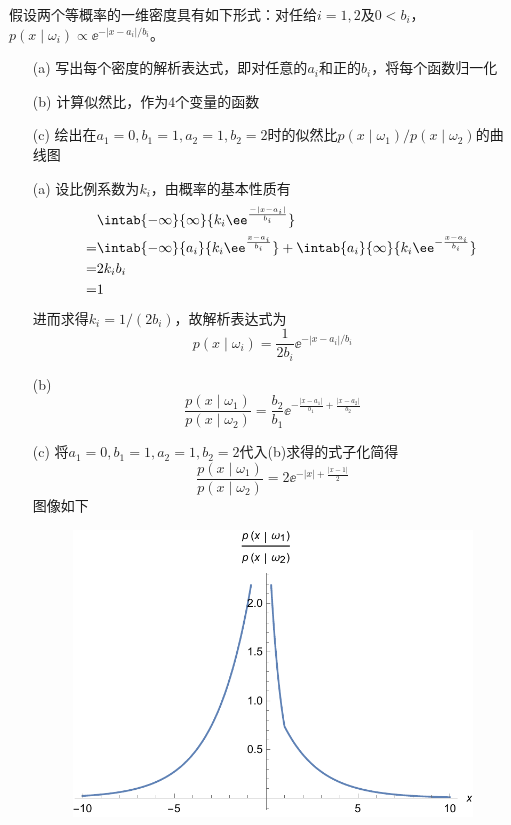 \documentclass[reportComp]{thesis}
\begin{document}
\begin{question}[\textsection 2 Q2]
假设两个等概率的一维密度具有如下形式：对任给$i=1,2$及$0<b_i$，$p(x\mid\omega_i)\propto\ee^{-|x-a_i|/b_i}$。
\begin{itemize}
	\item [(a)] 写出每个密度的解析表达式，即对任意的$a_i$和正的$b_i$，将每个函数归一化
	\item [(b)] 计算似然比，作为$4$个变量的函数
	\item [(c)] 绘出在$a_1=0,b_1=1,a_2=1,b_2=2$时的似然比$p(x\mid\omega_1)/p(x\mid\omega_2)$的曲线图
\end{itemize}
\end{question}
\begin{answer}
\begin{itemize}
	\item [(a)] 设比例系数为$k_i$，由概率的基本性质有
\[\begin{aligned}
\qquad&\intab{-\infty}{\infty}{k_i\ee^{\frac{-|x-a_i|}{b_i}}}\\
=&\intab{-\infty}{a_i}{k_i\ee^{\frac{x-a_i}{b_i}}}+\intab{a_i}{\infty}{k_i\ee^{-\frac{x-a_i}{b_i}}}\\
=&2k_ib_i\\\
=&1
\end{aligned}\]
进而求得$k_i=1/(2b_i)$，故解析表达式为
\[p(x\mid\omega_i)=\frac{1}{2b_i}\ee^{-|x-a_i|/b_i}\]
	\item [(b)]
\[\frac{p(x\mid\omega_1)}{p(x\mid\omega_2)}=\frac{b_2}{b_1}\ee^{-\frac{|x-a_1|}{b_1}+\frac{|x-a_2|}{b_2}}\]
	\item [(c)]
将$a_1=0,b_1=1,a_2=1,b_2=2$代入(b)求得的式子化简得
\[\frac{p(x\mid\omega_1)}{p(x\mid\omega_2)}=2\ee^{-|x|+\frac{|x-1|}{2}}\]
图像如下
\begin{figure}[H]
\centering
\includegraphics[width=0.5\linewidth]{likelihood.pdf}
\end{figure}
\end{itemize}
\end{answer}
\end{document}
